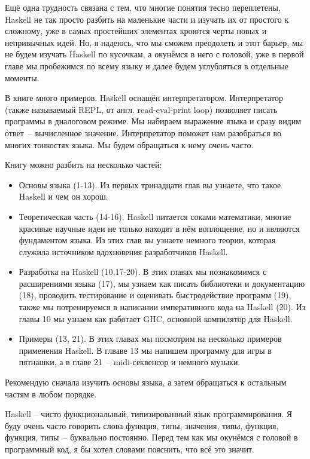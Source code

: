 Ещё одна трудность связана с тем, что многие понятия
тесно переплетены, Haskell не так просто разбить на 
маленькие части и изучать их от простого к сложному,
уже в самых простейших элементах кроются черты 
новых и непривычных идей. Но, я надеюсь, что мы сможем 
преодолеть и этот барьер, мы не будем изучать Haskell
по кусочкам, а окунёмся в него с головой, уже в первой
главе мы пробежимся по всему языку и далее будем
углубляться в отдельные моменты. 

В книге много примеров. Haskell оснащён интерпретатором.
Интерпретатор (также называемый REPL, от англ. read-eval-print loop)
позволяет писать программы в диалоговом режиме. 
Мы набираем выражение языка и сразу видим 
ответ~-- вычисленное значение. Интерпретатор поможет нам
разобраться во многих тонкостях языка. Мы будем обращаться к 
нему очень часто.

Книгу можно разбить на несколько частей:

\begin{itemize}
\item Основы языка (1-13). Из первых тринадцати глав вы узнаете,
что такое Haskell и чем он хорош. 

\item Теоретическая часть (14-16). Haskell питается соками математики,
многие красивые научные идеи не только находят в нём воплощение, 
но и являются фундаментом языка. Из этих глав вы узнаете немного
теории, которая служила источником вдохновения разработчиков Haskell.

\item Разработка на Haskell (10,17-20). В этих главах 
мы познакомимся с расширениями языка (17), 
мы узнаем как писать библиотеки
и документацию (18), проводить тестирование и оценивать 
быстродействие программ (19), также мы потренируемся в 
написании императивного кода на Haskell (20). 
Из главы 10 мы узнаем как работает GHC, основной 
компилятор для Haskell.

\item Примеры (13, 21). В этих главах мы посмотрим
на несколько примеров применения Haskell. В глваве 13
мы напишем программу для игры в пятнашки, а в главе
21~-- midi-секвенсор и немного музыки.

\end{itemize}

Рекомендую сначала изучить основы языка, а затем обращаться к 
остальным частям в любом порядке. 


Haskell -- чисто функциональный, типизированный язык программирования.
Я  буду очень часто говорить слова функция, типы, значения, типы, функция,
функция, типы~-- буквально постоянно. Перед тем как мы окунёмся с 
головой в программный код, я бы хотел словами пояснить, что всё это
значит. 

